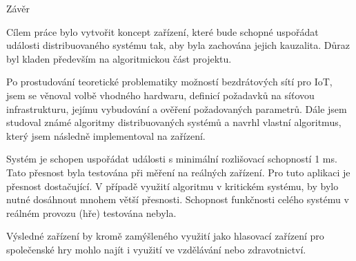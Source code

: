 
\def\ctustyle{{\ssr CTUstyle}}
\def\ttb{\tt\char`\\} %

\chap Závěr

Cílem práce bylo vytvořit koncept zařízení, které bude schopné uspořádat události distribuovaného systému tak, aby byla zachována jejich kauzalita. Důraz byl kladen především na algoritmickou část projektu.

Po prostudování teoretické problematiky možností bezdrátových sítí pro IoT, jsem se věnoval volbě vhodného hardwaru, definicí požadavků na síťovou infrastrukturu, jejímu vybudování a ověření požadovaných parametrů. Dále jsem studoval známé algoritmy distribuovaných systémů a navrhl vlastní algoritmus, který jsem následně implementoval na zařízení.

Systém je schopen uspořádat události s minimální rozlišovací schopností 1 ms. Tato přesnost byla testována při měření na reálných zařízení. Pro tuto aplikaci je přesnost dostačující. V případě využití algoritmu v kritickém systému, by bylo nutné dosáhnout mnohem větší přesnosti.  Schopnost funkčnosti celého systému v reálném provozu (hře) testována nebyla.

Výsledné zařízení by kromě zamýšleného využití jako hlasovací zařízení pro společenské hry mohlo najít i využití ve vzdělávání nebo zdravotnictví.